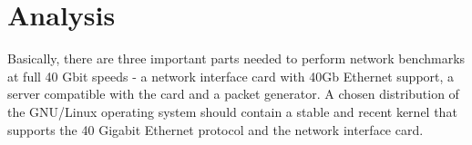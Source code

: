 
\chapter{Analysis}
Basically, there are three important parts needed to perform network benchmarks at full 40 Gbit speeds -
a network interface card with 40Gb Ethernet support, a server compatible with the card and a packet generator.
A chosen distribution of the GNU/Linux operating system should contain a stable and
recent kernel that supports the 40 Gigabit Ethernet protocol and the network interface card.









